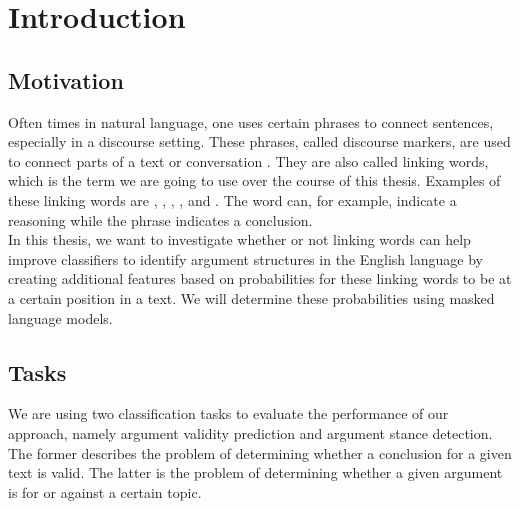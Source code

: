 \section{Introduction}
\subsection{Motivation}
Often times in natural language, one uses certain phrases to connect sentences, especially in a discourse setting. These phrases, called discourse markers, are used to connect parts of a text or conversation \cite{Discours1999}. They are also called linking words, which is the term we are going to use over the course of this thesis. Examples of these linking words are , , , , and . The word  can, for example, indicate a reasoning while the phrase  indicates a conclusion. \\
In this thesis, we want to investigate whether or not linking words can help improve classifiers to identify argument structures in the English language by creating additional features based on probabilities for these linking words to be at a certain position in a text. We will determine these probabilities using masked language models.
\subsection{Tasks}
We are using two classification tasks to evaluate the performance of our approach, namely argument validity prediction and argument stance detection. The former describes the problem of determining whether a conclusion for a given text is valid. The latter is the problem of determining whether a given argument is for or against a certain topic. \\
